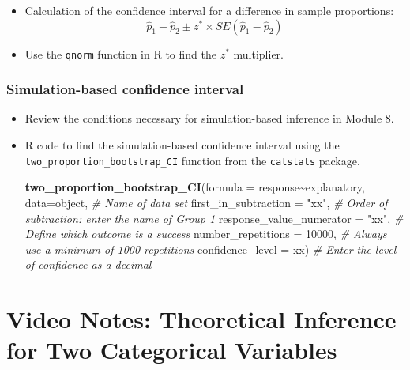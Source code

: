 \documentclass[
]{report}
\newenvironment{Shaded}{\begin{snugshade}}{\end{snugshade}}
\newcommand{\AttributeTok}[1]{\textcolor[rgb]{0.13,0.29,0.53}{#1}}
\newcommand{\CommentTok}[1]{\textcolor[rgb]{0.56,0.35,0.01}{\textit{#1}}}
\newcommand{\DecValTok}[1]{\textcolor[rgb]{0.00,0.00,0.81}{#1}}
\newcommand{\FunctionTok}[1]{\textcolor[rgb]{0.13,0.29,0.53}{\textbf{#1}}}
\newcommand{\NormalTok}[1]{#1}
\newcommand{\SpecialCharTok}[1]{\textcolor[rgb]{0.81,0.36,0.00}{\textbf{#1}}}
\newcommand{\StringTok}[1]{\textcolor[rgb]{0.31,0.60,0.02}{#1}}
\providecommand{\tightlist}{%
  \setlength{\itemsep}{0pt}\setlength{\parskip}{0pt}}
\begin{document}
\begin{itemize}
  \begin{itemize}
  \tightlist
  \item
    Calculation of the confidence interval for a difference in sample proportions:
    \[\hat{p}_1-\hat{p}_2\pm z^*\times SE(\hat{p}_1-\hat{p}_2)\]
  \item
    Use the \texttt{qnorm} function in R to find the \(z^*\) multiplier.
  \end{itemize}
\end{itemize}

\subsubsection*{Simulation-based confidence interval}\label{simulation-based-confidence-interval-1}

\begin{itemize}
\item
  Review the conditions necessary for simulation-based inference in Module 8.
\item
  R code to find the simulation-based confidence interval using the \texttt{two\_proportion\_bootstrap\_CI} function from the \texttt{catstats} package.

\begin{Shaded}
\begin{Highlighting}[]
\FunctionTok{two\_proportion\_bootstrap\_CI}\NormalTok{(}\AttributeTok{formula =}\NormalTok{ response}\SpecialCharTok{\textasciitilde{}}\NormalTok{explanatory, }
    \AttributeTok{data=}\NormalTok{object, }\CommentTok{\# Name of data set}
    \AttributeTok{first\_in\_subtraction =} \StringTok{"xx"}\NormalTok{, }\CommentTok{\# Order of subtraction: enter the name of Group 1}
    \AttributeTok{response\_value\_numerator =} \StringTok{"xx"}\NormalTok{, }\CommentTok{\# Define which outcome is a success }
    \AttributeTok{number\_repetitions =} \DecValTok{10000}\NormalTok{, }\CommentTok{\# Always use a minimum of 1000 repetitions}
    \AttributeTok{confidence\_level =}\NormalTok{ xx) }\CommentTok{\# Enter the level of confidence as a decimal}
\end{Highlighting}
\end{Shaded}
\end{itemize}

\newpage

\section{Video Notes: Theoretical Inference for Two Categorical Variables}\label{video-notes-theoretical-inference-for-two-categorical-variables}
\end{document}
